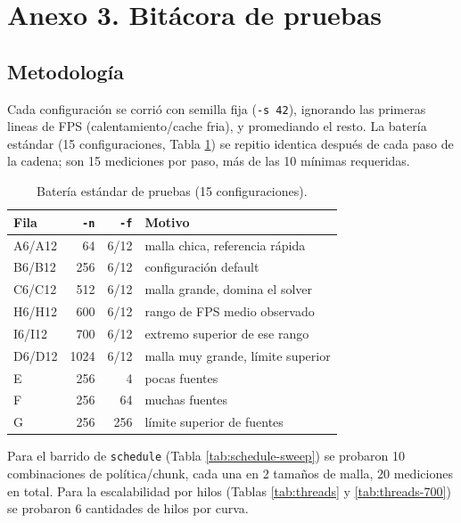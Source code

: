 \documentclass[11pt]{article}
\begin{document}
\clearpage
\section{Anexo 3. Bitácora de pruebas}

\subsection*{Metodología}

Cada configuración se corrió con semilla fija (\texttt{-s 42}), ignorando
las primeras lineas de FPS (calentamiento/cache fria), y promediando el
resto. La batería estándar (15 configuraciones, Tabla \ref{tab:matrix})
se repitio identica después de cada paso de la cadena; son 15 mediciones
por paso, más de las 10 mínimas requeridas.

\begin{table}[ht]
\centering
\small
\begin{tabular}{lrrl}
\toprule
Fila & \texttt{-n} & \texttt{-f} & Motivo \\
\midrule
A6/A12   & 64   & 6/12  & malla chica, referencia rápida \\
B6/B12   & 256  & 6/12  & configuración default \\
C6/C12   & 512  & 6/12  & malla grande, domina el solver \\
H6/H12   & 600  & 6/12  & rango de FPS medio observado \\
I6/I12   & 700  & 6/12  & extremo superior de ese rango \\
D6/D12   & 1024 & 6/12  & malla muy grande, límite superior \\
E        & 256  & 4     & pocas fuentes \\
F        & 256  & 64    & muchas fuentes \\
G        & 256  & 256   & límite superior de fuentes \\
\bottomrule
\end{tabular}
\caption{Batería estándar de pruebas (15 configuraciones).}
\label{tab:matrix}
\end{table}

Para el barrido de \texttt{schedule} (Tabla \ref{tab:schedule-sweep}) se
probaron 10 combinaciones de política/chunk, cada una en 2 tamaños de
malla, 20 mediciones en total. Para la escalabilidad por hilos (Tablas
\ref{tab:threads} y \ref{tab:threads-700}) se probaron 6 cantidades de
hilos por curva.
\end{document}
